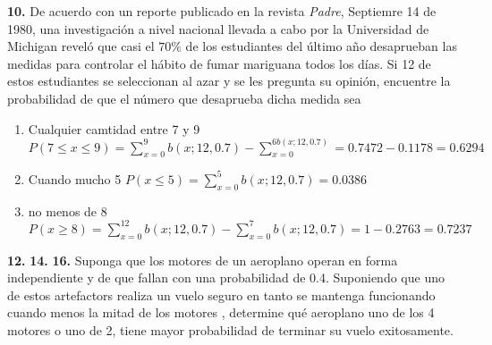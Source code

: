 \documentclass[12pt, letterpaper]{article}
\begin{document}
    \textbf{10. }De acuerdo con un reporte publicado en la revista \textit{Padre}, Septiemre 14 de 1980, una investigación
    a nivel nacional llevada a cabo por la Universidad de Michigan reveló que casi el $70\%$ de los estudiantes del
    último año desaprueban las medidas para controlar el hábito de fumar mariguana todos los días. Si 12 de estos
    estudiantes se seleccionan al azar y se les pregunta su opinión, encuentre la probabilidad de que el número que
    desaprueba dicha medida sea
    \begin{enumerate}
        \item Cualquier camtidad entre 7 y 9
            $P(7\leq x\leq 9)=\displaystyle\sum_{x=0}^{9}b(x;12,0.7)-\sum_{x=0}^{6b(x;12,0.7)}=0.7472-0.1178=0.6294$
        \item Cuando mucho 5
            $P(x\leq 5)=\displaystyle\sum_{x=0}^{5}b(x;12,0.7)=0.0386$
        \item no menos de 8
            $P(x\geq 8)=\displaystyle\sum_{x=0}^{12}b(x;12,0.7)-\sum_{x=0}^{7}b(x;12,0.7)=1-0.2763=0.7237$
    \end{enumerate}\vskip1cm

    \textbf{12. }\vskip1cm
    \textbf{14. }\vskip1cm
    \textbf{16.} Suponga que los motores de un aeroplano operan en forma independiente y de que fallan con una probabilidad de 0.4. Suponiendo que  uno de estos artefactors realiza un vuelo seguro en tanto se mantenga funcionando cuando menos la mitad  de los motores , determine qu\'e aeroplano uno de los 4 motores o uno de 2, tiene mayor probabilidad de terminar su vuelo exitosamente.\\
\end{document}
